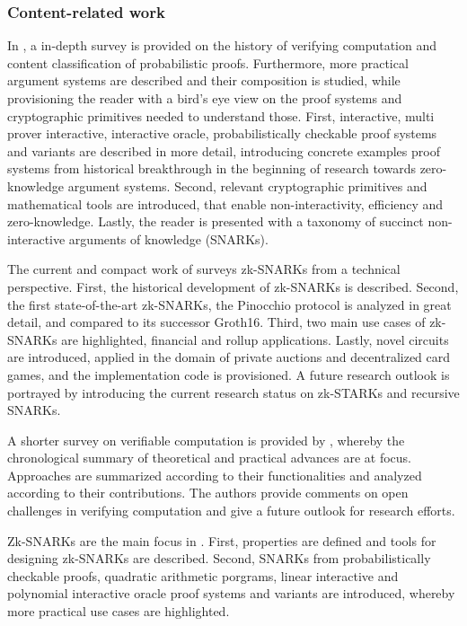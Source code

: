 \subsubsection{Content-related work}
In \citet{Thaler}, a in-depth survey is provided on the history of verifying computation and content classification of probabilistic proofs. Furthermore, more practical argument systems are described and their composition is studied, while provisioning the reader with a bird's eye view on the proof systems and cryptographic primitives needed to understand those. First, interactive, multi prover interactive, interactive oracle, probabilistically checkable proof systems and variants are described in more detail, introducing concrete examples proof systems from historical breakthrough in the beginning of research towards zero-knowledge argument systems. Second, relevant cryptographic primitives and mathematical tools are introduced, that enable non-interactivity, efficiency and zero-knowledge. Lastly, the reader is presented with a taxonomy of succinct non-interactive arguments of knowledge (SNARKs).

The current and compact work of \citet{chen2022review} surveys zk-SNARKs from a technical perspective. First, the historical development of zk-SNARKs is described. Second, the first state-of-the-art zk-SNARKs, the Pinocchio protocol is analyzed in great detail, and compared to its successor Groth16. Third, two main use cases of zk-SNARKs are highlighted, financial and rollup applications. Lastly, novel circuits are introduced, applied in the domain of private auctions and decentralized card games, and the implementation code is provisioned. A future research outlook is portrayed by introducing the current research status on zk-STARKs and recursive SNARKs.

A shorter survey on verifiable computation is provided by \citet{Ahmad}, whereby the chronological summary of theoretical and practical advances are at focus. Approaches are summarized according to their functionalities and analyzed according to their contributions. The authors provide comments on open challenges in verifying computation and give a future outlook for research efforts. 

Zk-SNARKs are the main focus in \citet{NitulescuGentleIntroSNARKs}. First, properties are defined and tools for designing zk-SNARKs are described. Second, SNARKs from probabilistically checkable proofs, quadratic arithmetic porgrams, linear interactive and polynomial interactive oracle proof systems and variants are introduced, whereby more practical use cases are highlighted. 


